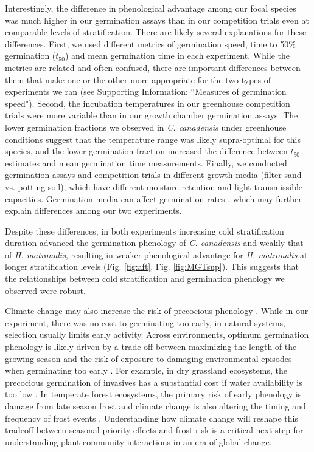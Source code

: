 \documentclass{article}[11pt]
\begin{document}
Interestingly, the difference in phenological advantage among our focal species was much higher in our germination assays than in our competition trials even at comparable levels of stratification. There are likely several explanations for these differences. First, we used different metrics of germination speed, time to 50\% germination ($t_{50}$) and mean germination time in each experiment. While the metrics are related and often confused, there are important differences between them that make one or the other more appropriate for the two types of experiments we ran (see Supporting Information: ``Measures of germination speed"). Second, the incubation temperatures in our greenhouse competition trials were more variable than in our growth chamber germination assays. The lower germination fractions we observed in \textit{C. canadensis} under greenhouse conditions suggest that the temperature range was likely supra-optimal for this species, and the lower germination fraction increased the difference between $t_{50}$ estimates and mean germination time measurements. Finally, we  conducted germination assays and competition trials in different growth media (filter sand vs. potting soil), which have different moisture retention and light transmissible capacities. Germination media can affect germination rates \citep{Baskin2014}, which may further explain differences among our two experiments.

Despite these differences, in both experiments increasing cold stratification duration advanced the germination phenology of \textit{C. canadensis} and weakly that of \textit{H. matronalis}, resulting in weaker phenological advantage for \textit{H. matronalis} at longer stratification levels (Fig. \ref{fig:aft}, Fig.  \ref{fig:MGTsup}). This suggests that the relationships between cold stratification and germination phenology we observed were robust. 

Climate change may also increase the risk of precocious phenology \citep{Inouye:2000ud}. While in our experiment, there was no cost to germinating too early, in natural systems, selection usually limits early activity. Across environments, optimum germination phenology is likely driven by a trade-off between maximizing the length of the growing season and the risk of exposure to damaging environmental episodes when germinating too early \citep{Augspurger:2017vu}. For example, in dry grassland ecosystems, the precocious germination of invasives has a substantial cost if water availability is too low \citep{Wainwright_2011}. In temperate forest ecosystems, the primary risk of early phenology is damage from late season frost \citep{Kollas:2014vn} and climate change is also altering the timing and frequency of frost events \citep{Ma:2019uf}. Understanding how climate change will reshape this tradeoff between seasonal priority effects and frost risk is a critical next step for understanding plant community interactions in an era of global change. 
\end{document}
